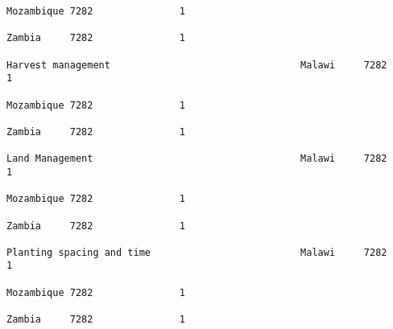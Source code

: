 \documentclass[11pt]{article}
\begin{document}
\begin{Verbatim}[commandchars=\\\{\}]
                                                                                                                                                                                                                 Mozambique 7282               1  
                                                                                                                                                                                                                 Zambia     7282               1  
                                                                                                                                                              Harvest management                                 Malawi     7282               1  
                                                                                                                                                                                                                 Mozambique 7282               1  
                                                                                                                                                                                                                 Zambia     7282               1  
                                                                                                                                                              Land Management                                    Malawi     7282               1  
                                                                                                                                                                                                                 Mozambique 7282               1  
                                                                                                                                                                                                                 Zambia     7282               1  
                                                                                                                                                              Planting spacing and time                          Malawi     7282               1  
                                                                                                                                                                                                                 Mozambique 7282               1  
                                                                                                                                                                                                                 Zambia     7282               1  

\end{Verbatim}
\end{document}
